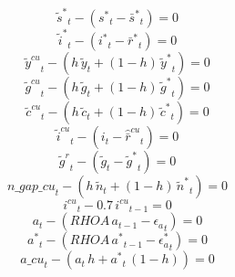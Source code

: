 \begin{dmath}
{{\tilde s^*}}_{t}-\left({{s^*}}_{t}-{{\bar s^*}}_{t}\right)=0
\end{dmath}
\begin{dmath}
{{\tilde i^*}}_{t}-\left({{i^*}}_{t}-{{\bar r^*}}_{t}\right)=0
\end{dmath}
\begin{dmath}
{{\tilde y^{cu}}}_{t}-\left({{h}}\, {{\tilde y}}_{t}+\left(1-{{h}}\right)\, {{\tilde y^*}}_{t}\right)=0
\end{dmath}
\begin{dmath}
{{\tilde g^{cu}}}_{t}-\left({{h}}\, {{\tilde g}}_{t}+\left(1-{{h}}\right)\, {{\tilde g^*}}_{t}\right)=0
\end{dmath}
\begin{dmath}
{{\tilde c^{cu}}}_{t}-\left({{h}}\, {{\tilde c}}_{t}+\left(1-{{h}}\right)\, {{\tilde c^*}}_{t}\right)=0
\end{dmath}
\begin{dmath}
{{\tilde i^{cu}}}_{t}-\left({{i}}_{t}-{{\hat {\bar r}^{cu}}}_{t}\right)=0
\end{dmath}
\begin{dmath}
{{\tilde g^{r}}}_{t}-\left({{\tilde g}}_{t}-{{\tilde g^*}}_{t}\right)=0
\end{dmath}
\begin{dmath}
{n\_gap\_cu}_{t}-\left({{h}}\, {{\tilde n}}_{t}+\left(1-{{h}}\right)\, {{\tilde n^*}}_{t}\right)=0
\end{dmath}
\begin{dmath}
{{i^{cu}}}_{t}-0.7\, {{i^{cu}}}_{t-1}=0
\end{dmath}
\begin{dmath}
{{a}}_{t}-\left({RHOA}\, {{a}}_{t-1}-{{\epsilon_a}}_{t}\right)=0
\end{dmath}
\begin{dmath}
{{a^*}}_{t}-\left({RHOA}\, {{a^*}}_{t-1}-{{\epsilon_a^*}}_{t}\right)=0
\end{dmath}
\begin{dmath}
{a\_cu}_{t}-\left({{a}}_{t}\, {{h}}+{{a^*}}_{t}\, \left(1-{{h}}\right)\right)=0
\end{dmath}
